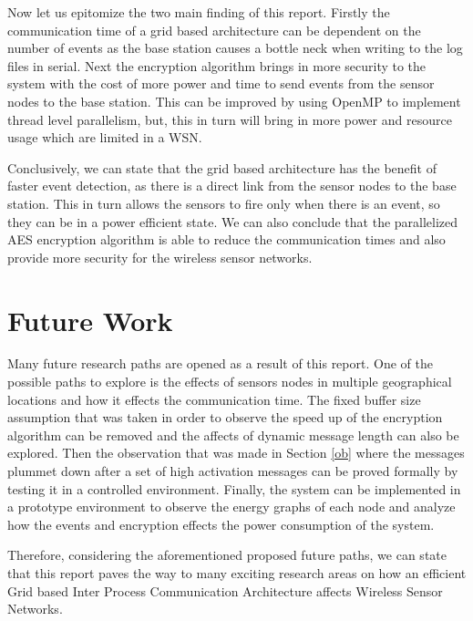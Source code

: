 \documentclass[conference]{IEEEtran}
\begin{document}
	Now let us epitomize the two main finding of this report. Firstly the communication time of a grid based architecture can be dependent on the number of events as the base station causes a bottle neck when writing to the log files in serial. Next the encryption algorithm brings in more security to the system with the cost of more power and time to send events from the sensor nodes to the base station. This can be improved by using OpenMP to implement thread level parallelism, but, this in turn will bring in more power and resource usage which are limited in a WSN.
	
	Conclusively, we can state that the grid based architecture has the benefit of faster event detection, as there is a direct link from the sensor nodes to the base station. This in turn allows the sensors to fire only when there is an event, so they can be in a power efficient state. We can also conclude that the parallelized AES encryption algorithm is able to reduce the communication times and also provide more security for the wireless sensor networks.
	
	
	\section{Future Work}
	
	Many future research paths are opened as a result of this report. One of the possible paths to explore is the effects of sensors nodes in multiple geographical locations and how it effects the communication time. The fixed buffer size assumption that was taken in order to observe the speed up of the encryption algorithm can be removed and the affects of dynamic message length can also be explored. Then the observation that was made in Section \ref{ob} where the messages plummet down after a set of high activation messages can be proved formally by testing it in a controlled environment. Finally, the system can be implemented in a prototype environment to observe the energy graphs of each node and analyze how the events and encryption effects the power consumption of the system.
	
	Therefore, considering the aforementioned proposed future paths, we can state that this report paves the way to many exciting research areas on how an efficient Grid based Inter Process Communication Architecture affects Wireless Sensor Networks.
	



	\newpage
	\onecolumn
	\appendix
	
\end{document}
